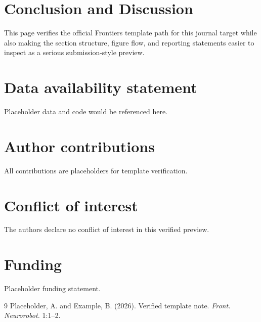 \documentclass[utf8]{FrontiersinHarvard}
\begin{document}
\section{Conclusion and Discussion}
This page verifies the official Frontiers template path for this journal target while also making the section structure, figure flow, and reporting statements easier to inspect as a serious submission-style preview.
\section*{Data availability statement}
Placeholder data and code would be referenced here.
\section*{Author contributions}
All contributions are placeholders for template verification.
\section*{Conflict of interest}
The authors declare no conflict of interest in this verified preview.
\section*{Funding}
Placeholder funding statement.
\begin{thebibliography}{9}
 Placeholder, A. and Example, B. (2026). Verified template note. \textit{Front. Neurorobot.} 1:1--2.
\end{thebibliography}
\end{document}
